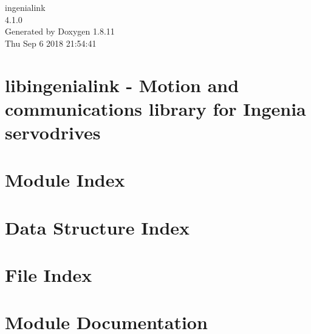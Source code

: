\documentclass[twoside]{book}
\newcommand{\+}{\discretionary{\mbox{\scriptsize$\hookleftarrow$}}{}{}}
\newcommand{\clearemptydoublepage}{%
  \newpage{\pagestyle{empty}\cleardoublepage}%
}
\begin{document}
\hypersetup{pageanchor=false,
             bookmarksnumbered=true,
             pdfencoding=unicode
            }
\begin{titlepage}
\vspace*{7cm}
\begin{center}%
{\Large ingenialink \\[1ex]\large 4.\+1.\+0 }\\
\vspace*{1cm}
{\large Generated by Doxygen 1.8.11}\\
\vspace*{0.5cm}
{\small Thu Sep 6 2018 21:54:41}\\
\end{center}
\end{titlepage}
\clearemptydoublepage
\tableofcontents
\clearemptydoublepage
{}
\hypersetup{pageanchor=true}

\chapter{libingenialink -\/ Motion and communications library for Ingenia servodrives}
\label{index}\hypertarget{index}{}
\chapter{Module Index}

\chapter{Data Structure Index}

\chapter{File Index}

\chapter{Module Documentation}






















\end{document}
